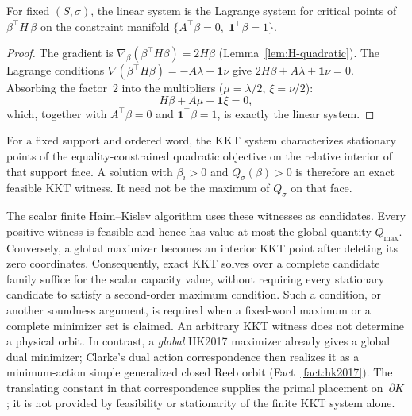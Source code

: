 \begin{notationupdated}
\begin{lemma}%
\label{lem:kkt}
For fixed $(S, \sigma)$, the linear
system is the Lagrange system for
critical points of
$\beta^\top H\, \beta$ on the constraint
manifold
$\{A^\top \beta = 0,\; \mathbf{1}^\top \beta = 1\}$.
\end{lemma}

\begin{proof}
The gradient is
$\nabla_{\beta}
  (\beta^\top H \beta) = 2H \beta$
(Lemma~\ref{lem:H-quadratic}).
The Lagrange conditions
$\nabla(\beta^\top H \beta)
= -A\lambda - \mathbf{1}\nu$
give
$2H\beta + A\lambda + \mathbf{1}\nu = 0$.
Absorbing the factor~$2$ into the multipliers
($\mu = \lambda/2$, $\xi = \nu/2$):
\[
  H \beta + A \mu + \mathbf{1} \xi = 0,
\]
which, together with $A^\top \beta = 0$ and
$\mathbf{1}^\top \beta = 1$, is exactly
the linear system.
\end{proof}
\end{notationupdated}

\begin{remark}
\label{rem:kkt-witness-versus-capacity}
For a fixed support and ordered word, the KKT system characterizes stationary
points of the equality-constrained quadratic objective on the relative
interior of that support face.  A solution with $\beta_i>0$ and
$Q_\sigma(\beta)>0$ is therefore an exact feasible KKT witness.  It need not
be the maximum of $Q_\sigma$ on that face.

The scalar finite Haim--Kislev algorithm uses these witnesses as candidates.
Every positive witness is feasible and hence has value at most the global
quantity $Q_{\max}$.  Conversely, a global maximizer becomes an interior KKT
point after deleting its zero coordinates.  Consequently, exact KKT solves
over a complete candidate family suffice for the scalar capacity value,
without requiring every stationary candidate to satisfy a second-order
maximum condition.  Such a condition, or another soundness argument, is
required when a fixed-word maximum or a complete minimizer set is claimed.
An arbitrary KKT witness does not determine a physical orbit.  In contrast, a
\emph{global} HK2017 maximizer already gives a global dual minimizer; Clarke's
dual action correspondence then realizes it as a minimum-action simple
generalized closed Reeb orbit (Fact~\ref{fact:hk2017}).  The translating
constant in that correspondence supplies the primal placement on~$\partial K$;
it is not provided by feasibility or stationarity of the finite KKT system
alone.
\end{remark}


